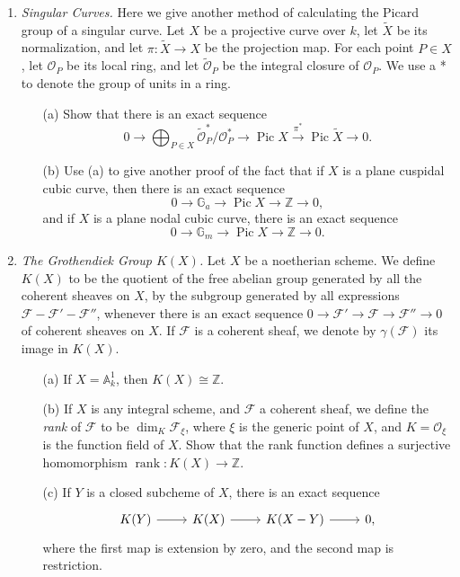 \documentclass{article}
\newcommand{\fF}{\mathcal{F}}
\newcommand{\fO}{\mathcal{O}}
\newcommand{\A}{\mathbb{A}}
\newcommand{\Z}{\mathbb{Z}}
\DeclareMathOperator{\rk}{rank}
\DeclareMathOperator{\pic}{Pic}
\begin{document}
\begin{enumerate} [label=\textbf{\arabic*.}, leftmargin=0em]
\item \textit{Singular Curves.} Here we give another method of calculating the Picard group of a singular curve. Let $X$ be a projective curve over $k$, let $\widetilde{X}$ be its normalization, and let $\pi : \widetilde{X} \to X$ be the projection map. For each point $P \in X$, let $\fO_P$ be its local ring, and let $\widetilde{\fO}_P$ be the integral closure of $\fO_P$. We use a * to denote the group of units in a ring.
\begin{itemize}
    \item[(a)] Show that there is an exact sequence
    \begin{equation*}
        0 \to \bigoplus_{P \in X} \widetilde{\fO}_P^* / \fO_P^* \to \pic X \xrightarrow{\pi^*} \pic \widetilde{X} \to 0.
    \end{equation*}
    \item[(b)] Use (a) to give another proof of the fact that if $X$ is a plane cuspidal cubic curve, then there is an exact sequence
    \begin{equation*}
        0 \to \mathbb{G}_a \to \pic X \to \Z \to 0,
    \end{equation*}
    and if $X$ is a plane nodal cubic curve, there is an exact sequence
    \begin{equation*}
        0 \to \mathbb{G}_m \to \pic X \to \Z \to 0.
    \end{equation*}
\end{itemize}

\item \textit{The Grothendiek Group $K(X)$.} Let $X$ be a noetherian scheme. We define $K(X)$ to be the quotient of the free abelian group generated by all the coherent sheaves on $X$, by the subgroup generated by all expressions $\fF - \fF' - \fF''$, whenever there is an exact sequence $0 \to \fF' \to \fF \to \fF'' \to 0$ of coherent sheaves on $X$. If $\fF$ is a coherent sheaf, we denote by $\gamma(\fF)$ its image in $K(X)$.
\begin{itemize}
    \item[(a)] If $X = \A_k^1$, then $K(X) \cong \Z$.

    \item[(b)] If $X$ is any integral scheme, and $\fF$ a coherent sheaf, we define the \textit{rank} of $\fF$ to be $\dim_K{\fF_\xi}$, where $\xi$ is the generic point of $X$, and $K = \fO_{\xi}$ is the function field of $X$. Show that the rank function defines a surjective homomorphism $\rk : K(X) \to \Z$.

    \item[(c)] If $Y$ is a closed subcheme of $X$, there is an exact sequence
    \[\begin{tikzcd}
        K(Y) \arrow[r] & K(X) \arrow[r] & K(X - Y) \arrow[r] & 0,
        \end{tikzcd} \]
    where the first map is extension by zero, and the second map is restriction.
\end{itemize}


\end{enumerate}
\end{document}
